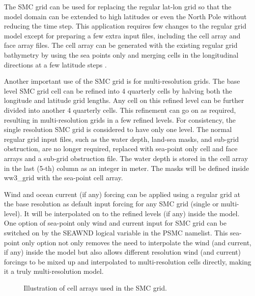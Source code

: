 The SMC grid can be used for replacing the regular lat-lon grid so that the
model domain can be extended to high latitudes or even the North Pole without
reducing the time step. This application requires few changes to the
regular grid model except for preparing a few extra input files, including the
cell array and face array files. The cell array can be generated with the
existing regular grid bathymetry by using the sea points only and merging
cells in the longitudinal directions at a few latitude steps \citep{art:Li11}.

Another important use of the SMC grid is for multi-resolution grids.
The base level SMC grid cell can be refined into 4 quarterly cells
by halving both the longitude and latitude grid lengths. Any cell
on this refined level can be further divided into another 4 quarterly
cells. This refinement can go on as required, resulting in multi-resolution
grids in a few refined levels. For consistency, the single resolution
SMC grid is considered to have only one level.  The normal regular grid input 
files, such as the water depth, land-sea masks, and sub-grid obstruction,
are no longer required, replaced with sea-point only cell and face arrays
and a sub-grid obstruction file.  The water depth is stored in the cell array 
in the last (5-th) column as an integer in meter.  The masks will be defined  
inside ww3\_grid with the sea-point cell array.

Wind and ocean current (if any) forcing can be applied using a regular grid at the base 
resolution as default input forcing for any SMC grid (single or multi-level). 
It will be interpolated on to the refined levels (if any) inside the model.
One option of sea-point only wind and current input for SMC grid can be 
switched on by the {\code SEAWND} logical variable in the {\F PSMC} namelist.  
This sea-point only option not only removes the need to interpolate the wind 
(and current, if any) inside the model but also allows different resolution wind 
(and current) forcings to be mixed up and interpolated to multi-resolution cells 
directly, making it a truly multi-resolution model. 

\begin{figure}
\centerline{}
\caption{Illustration of cell arrays used in the SMC grid.}
\label{fig:SMCells} \botline
\end{figure}

